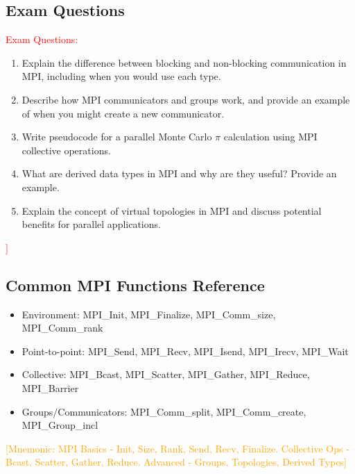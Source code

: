 \documentclass[12pt]{article}
\begin{document}
\subsection*{Exam Questions}
\textcolor{red}{Exam Questions:}
\begin{enumerate}
    \item Explain the difference between blocking and non-blocking communication in MPI, including when you would use each type.
    \item Describe how MPI communicators and groups work, and provide an example of when you might create a new communicator.
    \item Write pseudocode for a parallel Monte Carlo $\pi$ calculation using MPI collective operations.
    \item What are derived data types in MPI and why are they useful? Provide an example.
    \item Explain the concept of virtual topologies in MPI and discuss potential benefits for parallel applications.
\end{enumerate}
\textcolor{red}{]}

\subsection*{Common MPI Functions Reference}
\begin{itemize}
    \item Environment: MPI\_Init, MPI\_Finalize, MPI\_Comm\_size, MPI\_Comm\_rank
    \item Point-to-point: MPI\_Send, MPI\_Recv, MPI\_Isend, MPI\_Irecv, MPI\_Wait
    \item Collective: MPI\_Bcast, MPI\_Scatter, MPI\_Gather, MPI\_Reduce, MPI\_Barrier
    \item Groups/Communicators: MPI\_Comm\_split, MPI\_Comm\_create, MPI\_Group\_incl
\end{itemize}

\textcolor{orange}{[Mnemonic: MPI Basics - Init, Size, Rank, Send, Recv, Finalize. Collective Ops - Bcast, Scatter, Gather, Reduce. Advanced - Groups, Topologies, Derived Types]}
\end{document}
